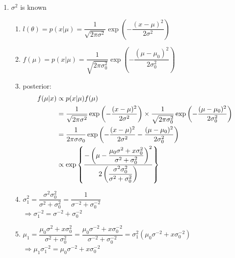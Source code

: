 \begin{enumerate}[itemsep=0.2cm]
    \item $\sigma^2$ is known
    \begin{enumerate}[itemsep=0.2cm]
        \item $
            l(\theta) 
            = p(x|\mu)
            =\dfrac{1}{\sqrt{2\pi \sigma^2}}
            \exp\left(
                -\dfrac{(x-\mu)^2}{2\sigma^2}
            \right)
        $

        \item $
            f(\mu) 
            = p(x|\mu)
            =\dfrac{1}{\sqrt{2\pi \sigma^2_0}}
            \exp\left(
                -\dfrac{(\mu-\mu_0)^2}{2\sigma_0^2}
            \right)
        $

        \item posterior:
        \[
        \begin{aligned}
            f(\mu|x)
            &\propto p(x|\mu)f(\mu) \\
            &=\dfrac{1}{\sqrt{2\pi \sigma^2}}
            \exp\left(
                -\dfrac{(x-\mu)^2}{2\sigma^2}
            \right) 
            \times 
            \dfrac{1}{\sqrt{2\pi \sigma^2_0}}
            \exp\left(
                -\dfrac{(\mu-\mu_0)^2}{2\sigma_0^2}
            \right) \\
            &=\dfrac{1}{2\pi \sigma\sigma_0}
            \exp\left(
                -\dfrac{(x-\mu)^2}{2\sigma^2}
                -\dfrac{(\mu-\mu_0)^2}{2\sigma_0^2}
            \right) \\
            &\propto
            \exp\left\{
                \dfrac{
                    -\left(\mu - \dfrac{\mu_0\sigma^2 + x\sigma_0^2}{\sigma^2 + \sigma^2_0}\right)^2
                }{
                    2\left( \dfrac{\sigma^2\sigma^2_0}{\sigma^2+\sigma^2_0} \right)
                }
            \right\}
        \end{aligned}
        \]

        \item $
            \sigma_1^2
            = \dfrac{\sigma^2\sigma^2_0}{\sigma^2+\sigma^2_0}
            = \dfrac{1}{\sigma^{-2}+\sigma^{-2}_0}
        $ \\[2ex]
        $
            \Rightarrow
            \sigma_1^{-2} = \sigma^{-2}+\sigma^{-2}_0
        $

        \item $
            \mu_1
            =  \dfrac{\mu_0\sigma^2 + x\sigma_0^2}{\sigma^2 + \sigma^2_0}
            =  \dfrac{\mu_0\sigma^{-2} + x\sigma_0^{-2}}{\sigma^{-2} + \sigma^{-2}_0}
            = \sigma_1^2(\mu_0\sigma^{-2} + x\sigma_0^{-2})
        $ \\[2ex]
        $
            \Rightarrow
            \mu_1\sigma_1^{-2} = \mu_0\sigma^{-2} + x\sigma_0^{-2}
        $


\end{enumerate}
\end{enumerate}
